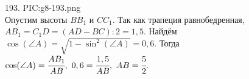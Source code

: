 193. {{PIC:g8-193.png}}\\
Опустим высоты $BB_1$ и $CC_1.$ Так как трапеция равнобедренная, $AB_1=C_1D=(AD-BC):2=1,5.$ Найдём $\cos(\angle A)=\sqrt{1-\sin^2(\angle A)}=0,6.$ Тогда
$\cos(\angle A)=\cfrac{AB_1}{AB},\ 0,6=\cfrac{1,5}{AB},\ AB=\cfrac{5}{2}.$\\
